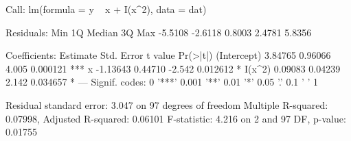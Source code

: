\begin{Schunk}
\begin{Soutput}
Call:
lm(formula = y ~ x + I(x^2), data = dat)

Residuals:
    Min      1Q  Median      3Q     Max 
-5.5108 -2.6118  0.8003  2.4781  5.8356 

Coefficients:
            Estimate Std. Error t value Pr(>|t|)    
(Intercept)  3.84765    0.96066   4.005 0.000121 ***
x           -1.13643    0.44710  -2.542 0.012612 *  
I(x^2)       0.09083    0.04239   2.142 0.034657 *  
---
Signif. codes:  0 '***' 0.001 '**' 0.01 '*' 0.05 '.' 0.1 ' ' 1

Residual standard error: 3.047 on 97 degrees of freedom
Multiple R-squared:  0.07998,	Adjusted R-squared:  0.06101 
F-statistic: 4.216 on 2 and 97 DF,  p-value: 0.01755
\end{Soutput}
\end{Schunk}
